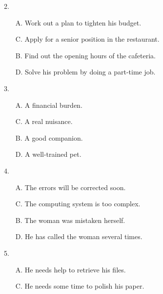 \documentclass[UTF8,11pt]{ctexart}
\begin{document}
2.


\begin{itemize}[leftmargin=2em,itemsep=.2em,topsep=.4em]\item[A.] Work out a plan to tighten his budget.
\item[C.] Apply for a senior position in the restaurant.
\end{itemize}

\begin{itemize}[leftmargin=2em,itemsep=.2em,topsep=.4em]\item[B.] Find out the opening hours of the cafeteria.
\item[D.] Solve his problem by doing a part-time job.
\end{itemize}

3.


\begin{itemize}[leftmargin=2em,itemsep=.2em,topsep=.4em]\item[A.] A financial burden.
\item[C.] A real nuisance.
\end{itemize}

\begin{itemize}[leftmargin=2em,itemsep=.2em,topsep=.4em]\item[B.] A good companion.
\item[D.] A well-trained pet.
\end{itemize}

4.


\begin{itemize}[leftmargin=2em,itemsep=.2em,topsep=.4em]\item[A.] The errors will be corrected soon.
\item[C.] The computing system is too complex.
\end{itemize}

\begin{itemize}[leftmargin=2em,itemsep=.2em,topsep=.4em]\item[B.] The woman was mistaken herself.
\item[D.] He has called the woman several times.
\end{itemize}

5.


\begin{itemize}[leftmargin=2em,itemsep=.2em,topsep=.4em]\item[A.] He needs help to retrieve his files.
\item[C.] He needs some time to polish his paper.
\end{itemize}
\end{document}
